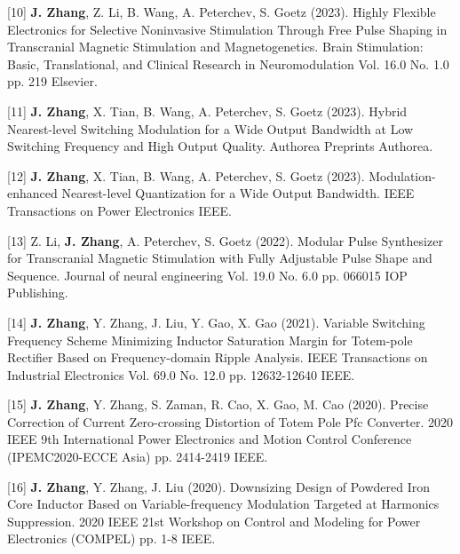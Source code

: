 [10] \textbf{J. Zhang}, Z. Li, B. Wang, A. Peterchev, S. Goetz (2023). Highly Flexible Electronics for Selective Noninvasive Stimulation Through Free Pulse Shaping in Transcranial Magnetic Stimulation and Magnetogenetics. Brain Stimulation: Basic, Translational, and Clinical Research in Neuromodulation Vol. 16.0 No. 1.0 pp. 219 Elsevier.

[11] \textbf{J. Zhang}, X. Tian, B. Wang, A. Peterchev, S. Goetz (2023). Hybrid Nearest-level Switching Modulation for a Wide Output Bandwidth at Low Switching Frequency and High Output Quality. Authorea Preprints    Authorea.

[12] \textbf{J. Zhang}, X. Tian, B. Wang, A. Peterchev, S. Goetz (2023). Modulation-enhanced Nearest-level Quantization for a Wide Output Bandwidth. IEEE Transactions on Power Electronics    IEEE.

[13] Z. Li, \textbf{J. Zhang}, A. Peterchev, S. Goetz (2022). Modular Pulse Synthesizer for Transcranial Magnetic Stimulation with Fully Adjustable Pulse Shape and Sequence. Journal of neural engineering Vol. 19.0 No. 6.0 pp. 066015 IOP Publishing.

[14] \textbf{J. Zhang}, Y. Zhang, J. Liu, Y. Gao, X. Gao (2021). Variable Switching Frequency Scheme Minimizing Inductor Saturation Margin for Totem-pole Rectifier Based on Frequency-domain Ripple Analysis. IEEE Transactions on Industrial Electronics Vol. 69.0 No. 12.0 pp. 12632-12640 IEEE.

[15] \textbf{J. Zhang}, Y. Zhang, S. Zaman, R. Cao, X. Gao, M. Cao (2020). Precise Correction of Current Zero-crossing Distortion of Totem Pole Pfc Converter. 2020 IEEE 9th International Power Electronics and Motion Control Conference (IPEMC2020-ECCE Asia)   pp. 2414-2419 IEEE.

[16] \textbf{J. Zhang}, Y. Zhang, J. Liu (2020). Downsizing Design of Powdered Iron Core Inductor Based on Variable-frequency Modulation Targeted at Harmonics Suppression. 2020 IEEE 21st Workshop on Control and Modeling for Power Electronics (COMPEL)   pp. 1-8 IEEE.